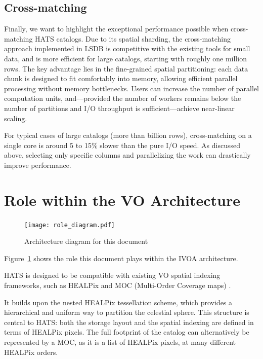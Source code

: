 \documentclass[11pt,a4paper]{ivoa}
\begin{document}
\subsection{Cross-matching}
Finally, we want to highlight the exceptional performance possible when cross-matching HATS catalogs. 
Due to its spatial sharding, the cross-matching approach implemented in LSDB is competitive with the existing tools for small data, and is more efficient for large catalogs, starting with roughly one million rows. 
The key advantage lies in the fine-grained spatial partitioning: each data chunk is designed to fit comfortably into memory, allowing efficient parallel processing without memory bottlenecks. Users can increase the number of parallel computation units, and—provided the number of workers remains below the number of partitions and I/O throughput is sufficient—achieve near-linear scaling. \par 

For typical cases of large catalogs (more than billion rows), cross-matching on a single core is around 5 to 15\% slower than the pure I/O speed. 
As discussed above, selecting only specific columns and parallelizing the work can drastically improve performance.   

\section{Role within the VO Architecture}

\begin{figure}
\centering

\texttt{[image: role\_diagram.pdf]}
\caption{Architecture diagram for this document}
\label{fig:archdiag}
\end{figure}

Figure~\ref{fig:archdiag} shows the role this document plays within the IVOA architecture.

HATS is designed to be compatible with existing VO spatial indexing frameworks, such as HEALPix and MOC (Multi-Order Coverage maps) \citep{ivoa:MOC}. \par
It builds upon the nested HEALPix tessellation scheme, which provides a hierarchical and uniform way to partition the celestial sphere. This structure is central to HATS: both the storage layout and the spatial indexing are defined in terms of HEALPix pixels.
The full footprint of the catalog can alternatively be represented by a MOC, as it is a list of HEALPix pixels, at many different HEALPix orders. \par 
\end{document}
